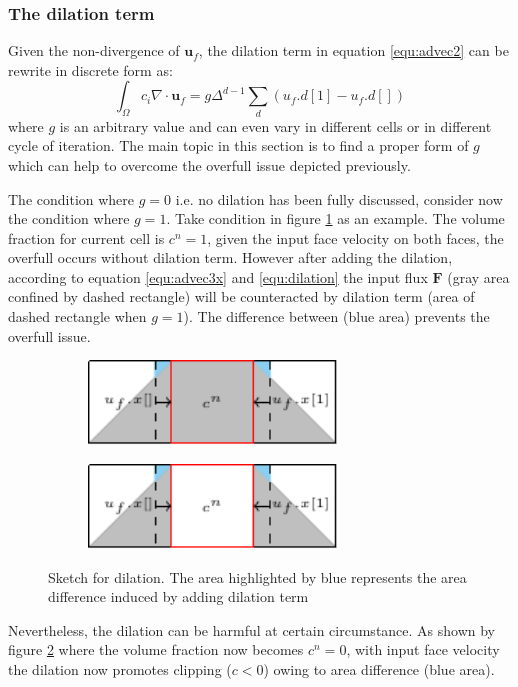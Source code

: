 \subsubsection{The dilation term}
Given the non-divergence of $\mathbf{u}_f$, the dilation term in equation \ref{equ:advec2} can be rewrite in discrete form as:
\begin{equation}\label{equ:dilation}
    \int_{\Omega}c_i\nabla\cdot\mathbf{u}_f = g\Delta^{d-1} \sum_d(u_f.d[1]-u_f.d[])
\end{equation}
where $g$ is an arbitrary value and can even vary in different cells or in different cycle of iteration. The main topic in this section is to find a proper form of $g$ which can help to overcome the overfull issue depicted previously.\par
The condition where $g=0$ i.e. no dilation has been fully discussed, consider now the condition where $g=1$. Take condition in figure \ref{fig:dilation1} as an example. The volume fraction for current cell is $c^n = 1$, given the input face velocity on both faces, the overfull occurs without dilation term. However after adding the dilation, according to equation \ref{equ:advec3x} and \ref{equ:dilation} the input flux $\mathbf{F}$ (gray area confined by dashed rectangle) will be counteracted by dilation term (area of dashed rectangle when $g=1$). The difference between (blue area) prevents the overfull issue.\par
\begin{figure}[!htbp]
    \centering
    \begin{subfigure}[b]{0.45\textwidth}
        \centering
        \includegraphics[height=2.25cm]{./image/vof-h/dilation1}
        \subcaption{}
        \label{fig:dilation1}
    \end{subfigure}
    \begin{subfigure}[b]{0.45\textwidth}
        \centering
        \includegraphics[height=2.25cm]{./image/vof-h/dilation2}
        \subcaption{}
        \label{fig:dilation2}
    \end{subfigure}
    \caption{Sketch for dilation. The area highlighted by blue represents the area difference induced by adding dilation term}
    \label{fig:dilation}
\end{figure}
Nevertheless, the dilation can be harmful at certain circumstance. As shown by figure \ref{fig:dilation2} where the volume fraction now becomes $c^n=0$, with input face velocity the dilation now promotes clipping ($c<0$) owing to area difference (blue area).
